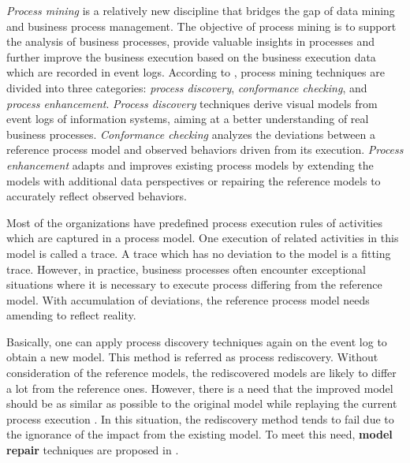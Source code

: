 %
\emph{Process mining} is a relatively new discipline that bridges the gap of data mining and business process management. The objective of process mining is to support the analysis of business processes, provide valuable insights in processes and further improve the business execution based on the business execution data which are recorded in event logs. According to  \cite{van2011process}, process mining techniques are divided into three categories: \emph{process discovery}, \emph{conformance checking}, and \emph{process enhancement}. \emph{Process discovery} techniques derive visual models from event logs of information systems, aiming at a better understanding of real business processes. \emph{Conformance checking} analyzes the deviations between a reference process model and observed behaviors driven from its execution. \emph{Process enhancement} adapts and improves existing process models by extending the models with additional data perspectives or repairing the reference models to accurately reflect observed behaviors. 

Most of the organizations have predefined process execution rules of activities which are captured in a process model. One execution of related activities in this model is called a trace. A trace which has no deviation to the model is a fitting trace. However, in practice, business processes often encounter exceptional situations where it is necessary to execute process differing from the reference model. With accumulation of deviations, the reference process model needs amending to reflect reality. 


Basically, one can apply process discovery techniques again on the event log to obtain a new model. This method is referred as process rediscovery.  Without consideration of the reference models, the rediscovered models are likely to differ a lot from the reference ones. However, there is a need that the improved model should be as similar as possible to the original model while replaying the current process execution \cite{fahland2012repairing}. In this situation, the rediscovery method tends to fail due to the ignorance of the impact from the existing model. To meet this need, \textbf{model repair} techniques are proposed in  \cite{fahland2012repairing}.


